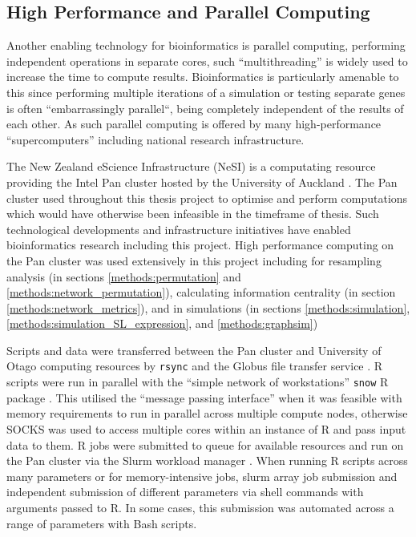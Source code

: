 \subsection{High Performance and Parallel Computing} \label{methods:HPC}
Another enabling technology for bioinformatics is parallel computing, performing independent operations in separate cores, such ``multithreading'' is widely used to increase the time to compute results. Bioinformatics is particularly amenable to this since performing multiple iterations of a simulation or testing separate genes is often ``embarrassingly parallel``, being completely independent of the results of each other. As such parallel computing is offered by many high-performance ``supercomputers'' including national research infrastructure.

The New Zealand eScience Infrastructure (NeSI) is a computating resource providing the Intel Pan cluster hosted by the University of Auckland \citep{NeSI}. The Pan cluster used throughout this thesis project to optimise and perform computations which would have otherwise been infeasible in the timeframe of thesis. Such technological developments and infrastructure initiatives have enabled bioinformatics research including this project.  High performance computing on the Pan cluster was used extensively in this project including for resampling analysis (in sections \ref{methods:permutation} and \ref{methods:network_permutation}), calculating information centrality (in section \ref{methods:network_metrics}), and in simulations (in sections \ref{methods:simulation}, \ref{methods:simulation_SL_expression}, and \ref{methods:graphsim})

Scripts and data were transferred between the Pan cluster and University of Otago computing resources by \texttt{rsync} and the Globus file transfer service \citep{Globus}. R scripts \citep{R_core} were run in parallel with the ``simple network of workstations'' \texttt{snow} R package \citet{snow}. This utilised the ``message passing interface'' \citep{Rmpi} when it was feasible with memory requirements to run in parallel across multiple compute nodes, otherwise SOCKS was used to access multiple cores within an instance of R and pass input data to them. R jobs were submitted to queue for available resources and run on the Pan cluster via the Slurm workload manager \citep{slurm}. When running R scripts across many parameters or for memory-intensive jobs, slurm array job submission and independent submission of different parameters via shell commands with arguments passed to R. In some cases, this submission was automated across a range of parameters with Bash scripts.

